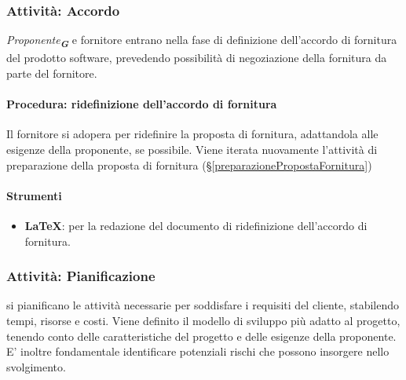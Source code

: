 \documentclass[a4paper,12pt]{article}
\newcommand{\glossario}[1]{\textit{#1}\textsubscript{\textbf{\textit{\textcolor{lightblack}{G}}}}}
\begin{document}
\subsubsection{Attività: Accordo}
\glossario{Proponente} e fornitore entrano nella fase di definizione dell'accordo di
fornitura del prodotto software, prevedendo possibilità di negoziazione della
fornitura da parte del fornitore.

\paragraph{Procedura: ridefinizione dell'accordo di fornitura}
Il fornitore si adopera per ridefinire la proposta di fornitura, adattandola
alle esigenze della proponente, se possibile. Viene iterata nuovamente
l'attività di preparazione della proposta di fornitura
(§\ref{preparazionePropostaFornitura})

\paragraph{Strumenti}
\begin{itemize}
    \item \textbf{\LaTeX}: per la redazione del documento di ridefinizione dell'accordo di fornitura.
\end{itemize}

\subsubsection{Attività: Pianificazione}
si pianificano le attività necessarie per soddisfare i requisiti del cliente,
stabilendo tempi, risorse e costi. Viene definito il modello di sviluppo più
adatto al progetto, tenendo conto delle caratteristiche del progetto e delle
esigenze della proponente. E' inoltre fondamentale identificare potenziali
rischi che possono insorgere nello svolgimento.
\end{document}

